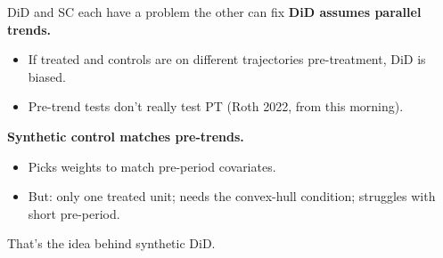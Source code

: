 \documentclass[aspectratio=169,11pt]{beamer}
\begin{document}



\begin{frame}{DiD and SC each have a problem the other can fix}
\vspace{0.5em}
\textbf{DiD assumes parallel trends.} \;
\begin{itemize}\small
  \item If treated and controls are on different trajectories pre-treatment, DiD is biased.
  \item Pre-trend tests don't really test PT (Roth 2022, from this morning).
\end{itemize}

\vspace{0.6em}
\textbf{Synthetic control matches pre-trends.} \;
\begin{itemize}\small
  \item Picks weights to match pre-period covariates.
  \item But: only one treated unit; needs the convex-hull condition; struggles with short pre-period.
\end{itemize}

\vspace{0.7em}
 \;That's the idea behind synthetic DiD.

\vspace{0.3em}
\end{frame}
\end{document}
